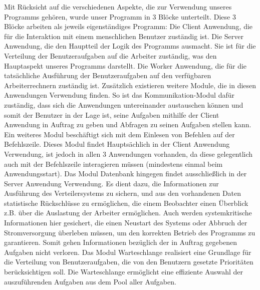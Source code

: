 \documentclass[a4paper,12pt]{article}
\begin{document}
Mit Rücksicht auf die verschiedenen Aspekte, die zur Verwendung unseres Programms gehören, wurde unser Programm in 3 Blöcke unterteilt. Diese 3 Blöcke arbeiten als jeweils eigenständiges Programm:\newline
Die Client Anwendung, die für die Interaktion mit einem menschlichen Benutzer zuständig ist.\newline
Die Server Anwendung, die den Hauptteil der Logik des Programms ausmacht. Sie ist für die Verteilung der Benutzeraufgaben auf die Arbeiter zuständig, was den Hauptaspekt unseres Programms darstellt.\newline
Die Worker Anwendung, die für die tatsächliche Ausführung der Benutzeraufgaben auf den verfügbaren Arbeiterrechnern zuständig ist.\newline
\newline
Zusätzlich existieren weitere Module, die in diesen Anwendungen Verwendung finden. So ist das Kommunikation-Modul dafür zuständig, dass sich die Anwendungen untereinander austauschen können und somit der Benutzer in der Lage ist, seine Aufgaben mithilfe der Client Anwendung in Auftrag zu geben und Abfragen zu seinen Aufgaben stellen kann.\newline
Ein weiteres Modul beschäftigt sich mit dem Einlesen von Befehlen auf der Befehlszeile. Dieses Modul findet Hauptsächlich in der Client Anwendung Verwendung, ist jedoch in allen 3 Anwendungen vorhanden, da diese gelegentlich auch mit der Befehlszeile interagieren müssen (mindestens einmal beim Anwendungsstart).
\newline
Das Modul Datenbank hingegen findet ausschließlich in der Server Anwendung Verwendung. Es dient dazu, die Informationen zur Ausführung des Verteilersystems zu sichern, und aus den vorhandenen Daten statistische Rückschlüsse zu ermöglichen, die einem Beobachter einen Überblick z.B. über die Auslastung der Arbeiter ermöglichen. Auch werden systemkritische Informationen hier gesichert, die einen Neustart des Systems oder Abbruch der Stromversorgung überleben müssen, um den korrekten Betrieb des Programms zu garantieren. Somit gehen Informationen bezüglich der in Auftrag gegebenen Aufgaben nicht verloren.
\newline
Das Modul Warteschlange realisiert eine Grundlage für die Verteilung von Benutzeraufgaben, die von den Benutzern gesetzte Prioritäten berücksichtigen soll. Die Warteschlange ermöglicht eine effiziente Auswahl der auszuführenden Aufgaben aus dem Pool aller Aufgaben.

\clearpage
\end{document}
